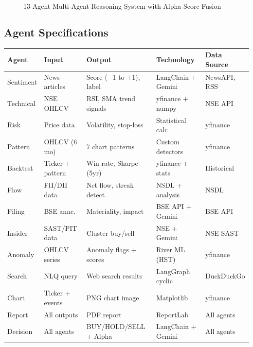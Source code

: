 \documentclass[11pt, a4paper]{article}
\begin{document}
\begin{figure}[H]
\caption{13-Agent Multi-Agent Reasoning System with Alpha Score Fusion}
\end{figure}

\subsection{Agent Specifications}

\begin{center}
\scriptsize
\begin{tabular}{L{2.0cm} L{2.6cm} L{3.0cm} L{2.8cm} L{2.4cm}}
  \toprule
  \textbf{Agent} & \textbf{Input} & \textbf{Output} & \textbf{Technology} & \textbf{Data Source} \\
  \midrule
  Sentiment  & News articles & Score ($-1$ to $+1$), label & LangChain + Gemini & NewsAPI, RSS \\
  Technical  & NSE OHLCV     & RSI, SMA trend signals  & yfinance + numpy & NSE API \\
  Risk       & Price data    & Volatility, stop-loss   & Statistical calc & yfinance \\
  Pattern    & OHLCV (6 mo)  & 7 chart patterns & Custom detectors & yfinance \\
  Backtest   & Ticker + pattern & Win rate, Sharpe (5yr)& yfinance + stats & Historical \\
  Flow       & FII/DII data  & Net flow, streak detect & NSDL + analysis & NSDL \\
  Filing     & BSE annc.     & Materiality, impact     & BSE API + Gemini & BSE API \\
  Insider    & SAST/PIT data & Cluster buy/sell        & NSE + Gemini & NSE SAST \\
  Anomaly    & OHLCV series  & Anomaly flags + scores  & River ML (HST) & yfinance \\
  Search     & NLQ query     & Web search results    & LangGraph cyclic & DuckDuckGo \\
  Chart      & Ticker + events & PNG chart image       & Matplotlib & yfinance \\
  Report     & All outputs   & PDF report              & ReportLab & All agents \\
  Decision   & All agents    & BUY/HOLD/SELL + Alpha & LangChain + Gemini & All agents \\
  \bottomrule
\end{tabular}
\end{center}
\end{document}
